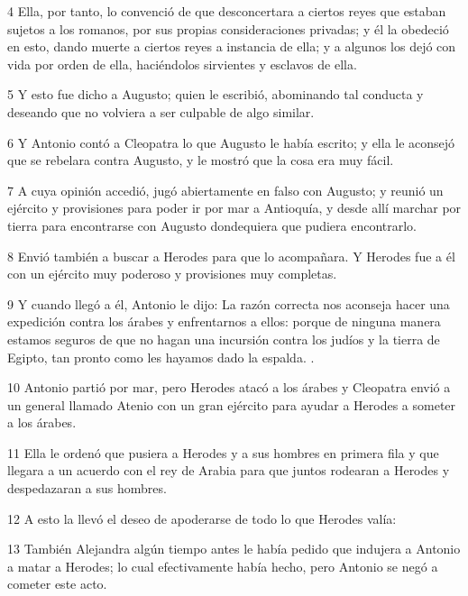 \par 4 Ella, por tanto, lo convenció de que desconcertara a ciertos reyes que estaban sujetos a los romanos, por sus propias consideraciones privadas; y él la obedeció en esto, dando muerte a ciertos reyes a instancia de ella; y a algunos los dejó con vida por orden de ella, haciéndolos sirvientes y esclavos de ella.

\par 5 Y esto fue dicho a Augusto; quien le escribió, abominando tal conducta y deseando que no volviera a ser culpable de algo similar.

\par 6 Y Antonio contó a Cleopatra lo que Augusto le había escrito; y ella le aconsejó que se rebelara contra Augusto, y le mostró que la cosa era muy fácil.

\par 7 A cuya opinión accedió, jugó abiertamente en falso con Augusto; y reunió un ejército y provisiones para poder ir por mar a Antioquía, y desde allí marchar por tierra para encontrarse con Augusto dondequiera que pudiera encontrarlo.

\par 8 Envió también a buscar a Herodes para que lo acompañara. Y Herodes fue a él con un ejército muy poderoso y provisiones muy completas.

\par 9 Y cuando llegó a él, Antonio le dijo: La razón correcta nos aconseja hacer una expedición contra los árabes y enfrentarnos a ellos: porque de ninguna manera estamos seguros de que no hagan una incursión contra los judíos y la tierra de Egipto, tan pronto como les hayamos dado la espalda. .

\par 10 Antonio partió por mar, pero Herodes atacó a los árabes y Cleopatra envió a un general llamado Atenio con un gran ejército para ayudar a Herodes a someter a los árabes.

\par 11 Ella le ordenó que pusiera a Herodes y a sus hombres en primera fila y que llegara a un acuerdo con el rey de Arabia para que juntos rodearan a Herodes y despedazaran a sus hombres.

\par 12 A esto la llevó el deseo de apoderarse de todo lo que Herodes valía:

\par 13 También Alejandra algún tiempo antes le había pedido que indujera a Antonio a matar a Herodes; lo cual efectivamente había hecho, pero Antonio se negó a cometer este acto.


